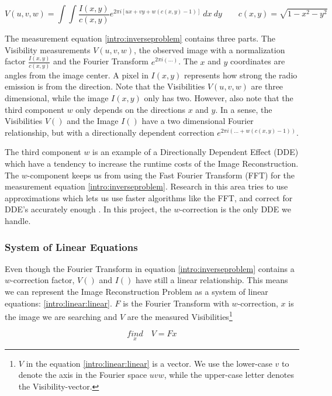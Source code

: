 \begin{equation}\label{intro:inverseproblem}
V(u, v, w) = \int\int  \frac{I(x, y)}{c(x, y)}  e^{2 \pi i [ux+vy+ w(c(x, y) - 1)]} \: dx \: dy \quad \quad c(x,y) = \sqrt{1 - x^2 - y ^2}
\end{equation}

The measurement equation \eqref{intro:inverseproblem} contains three parts. The Visibility measurements $V(u,v,w)$, the observed image with a normalization factor $\frac{I(x, y)}{c(x, y)}$ and the Fourier Transform $e^{2 \pi i (\ldots)}$. The $x$ and $y$ coordinates are angles from the image center. A pixel in $I(x,y)$ represents how strong the radio emission is from the direction. Note that the Visibilities $V(u,v,w)$ are three dimensional, while the image $I(x,y)$ only has two. However, also note that the third component $w$ only depends on the directions $x$ and $y$. In a sense, the Visibilities $V()$ and the Image $I()$ have a two dimensional Fourier relationship, but with a directionally dependent correction $e^{2 \pi i (\ldots +w(c(x, y) - 1))}$. 

The third component $w$ is an example of a Directionally Dependent Effect (DDE) which have a tendency to increase the runtime costs of the Image Reconstruction. The $w$-component keeps us from using the Fast Fourier Transform (FFT) for the measurement equation \eqref{intro:inverseproblem}. Research in this area tries to use approximations which lets us use faster algorithms like the FFT, and correct for DDE's accurately enough \cite{veenboer2017image, offringa2014wsclean, pratley2018fast}. In this project, the $w$-correction is the only DDE we handle.

\subsubsection{System of Linear Equations}\label{intro:linear}
Even though the Fourier Transform in equation \eqref{intro:inverseproblem} contains a $w$-correction factor, $V()$ and $I()$ have still a linear relationship. This means we can represent the Image Reconstruction Problem as a system of linear equations: \eqref{intro:linear:linear}. $F$ is the Fourier Transform with $w$-correction, $x$ is the image we are searching and $V$ are the measured Visibilities\footnote{$V$ in the equation \eqref{intro:linear:linear} is a vector. We use the lower-case $v$ to denote the axis in the Fourier space $uvw$, while the upper-case letter denotes the Visibility-vector.}

\begin{equation}\label{intro:linear:linear}
\underset{x}{find}\quad V = Fx
\end{equation}

